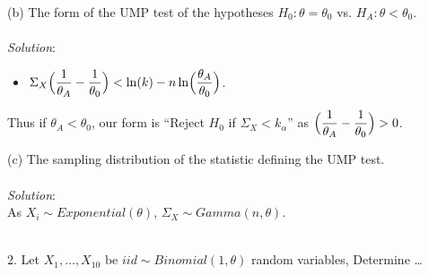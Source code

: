 \documentclass[12pt]{article}
\newcommand{\XB}{\color{black}}
\newcommand{\XBB}{\color{blue}}
\newcommand{\ds}{\displaystyle}
\begin{document}
\vspace{2.5mm}

(b) The form of the UMP test of the hypotheses $ H_{0} : \theta = \theta_{0} $ vs. $ H_{A} : \theta < \theta_{0} $. \\
\vspace{2.5mm} \\
\textit{Solution}:
\vspace{2.5mm} \\

\begin{itemize}
    \item $ \ds \Sigma_{X} \Bigl( \frac{1}{\theta_{A}} - \frac{1}{\theta_{0}} \Bigr) < \ln(k) - n\ln\Bigl( \frac{\theta_{A}}{\theta_{0}} \Bigr) $.
\end{itemize}

\noindent
Thus if $ \theta_{A} < \theta_{0} $, our form is ``Reject $ H_{0} $ if $ \Sigma_{X} < k_{\alpha} $'' as $ \ds \Bigl( \frac{1}{\theta_{A}} - \frac{1}{\theta_{0}} \Bigr) > 0 $. \\

\vspace{2.5mm}

(c) The sampling distribution of the statistic defining the UMP test. \\
\vspace{2.5mm} \\
\textit{Solution}:
\vspace{2.5mm} \\

\noindent
As $ X_{i} \sim Exponential(\theta) $, $ \Sigma_{X} \sim Gamma(n, \theta) $. \\

\vspace{2.5mm}

\newpage
\XBB\hrulefill\XB \\

2. Let $ X_{1}, \dots , X_{10} $ be $ iid \sim Binomial(1, \theta) $ random variables, Determine \dots \\
\end{document}
